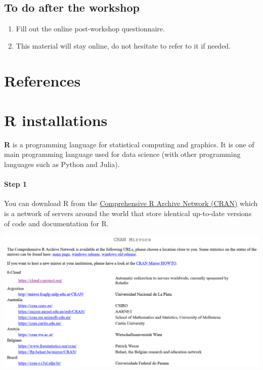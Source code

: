 \documentclass[
  letterpaper,
  DIV=11,
  numbers=noendperiod]{scrreprt}
\providecommand{\tightlist}{%
  \setlength{\itemsep}{0pt}\setlength{\parskip}{0pt}}\usepackage{longtable,booktabs,array}
\newlength{\cslhangindent}
\newlength{\cslentryspacingunit} %
\newenvironment{CSLReferences}[2] %
 {%
  \setlength{\parindent}{0pt}
  \ifodd #1
  \let\oldpar\par
  \def\par{\hangindent=\cslhangindent\oldpar}
  \fi
  \setlength{\parskip}{#2\cslentryspacingunit}
 }%
 {}
\begin{document}
\hypertarget{to-do-after-the-workshop}{%
\section{To do after the workshop}\label{to-do-after-the-workshop}}

\begin{enumerate}
\def\labelenumi{\arabic{enumi}.}
\tightlist
\item
  Fill out the online post-workshop questionnaire.
\item
  This material will stay online, do not hesitate to refer to it if
  needed.
\end{enumerate}


\hypertarget{references}{%
\chapter*{References}\label{references}}

\hypertarget{refs}{}
\begin{CSLReferences}{0}{0}
\end{CSLReferences}

\appendix
{}

\hypertarget{r-installations}{%
\chapter{R installations}\label{r-installations}}

\textbf{R} is a programming language for statistical computing and
graphics. It is one of main programming language used for data science
(with other programming languages such as Python and Julia).

\hypertarget{step-1}{%
\subsubsection{Step 1}\label{step-1}}

You can download R from the
\href{https://cran.r-project.org/mirrors.html}{Comprehensive R Archive
Network (CRAN)} which is a network of servers around the world that
store identical up-to-date versions of code and documentation for R.

\includegraphics{./images/paste-13103C13.png}
\end{document}
